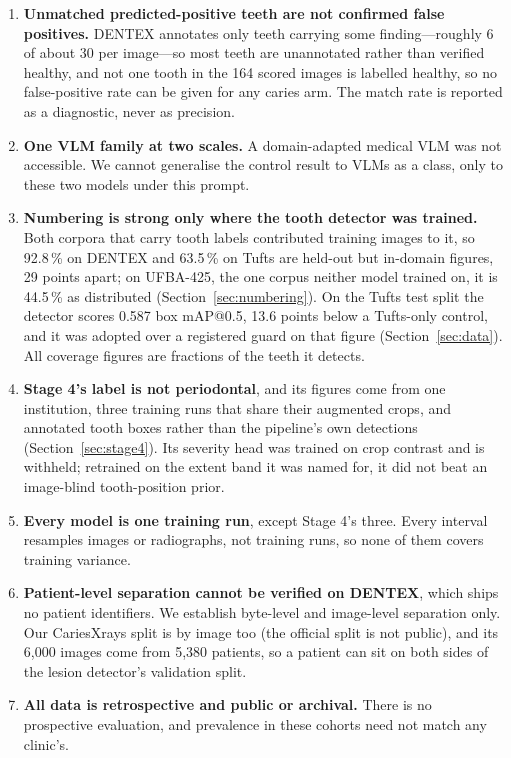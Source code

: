 \documentclass[conference]{IEEEtran}
\begin{document}
\begin{enumerate}
        false-positive rate are not computable there; we report agreement only,
        which cannot be penalised for over-flagging.
  \item \textbf{Unmatched predicted-positive teeth are not confirmed false
        positives.} DENTEX annotates only teeth carrying some finding---roughly 6
        of about 30 per image---so most teeth are unannotated rather than verified
        healthy, and not one tooth in the 164 scored images is labelled healthy,
        so no false-positive rate can be given for any caries arm. The match rate
        is reported as a diagnostic, never as precision.
  \item \textbf{One VLM family at two scales.} A domain-adapted medical VLM was
        not accessible. We cannot generalise the control result to VLMs as a
        class, only to these two models under this prompt.
  \item \textbf{Numbering is strong only where the tooth detector was trained.}
        Both corpora that carry tooth labels contributed training images to it,
        so 92.8\,\% on DENTEX and 63.5\,\% on Tufts are held-out but in-domain
        figures, 29 points apart; on UFBA-425, the one corpus neither model
        trained on, it is 44.5\,\% as distributed (Section~\ref{sec:numbering}). On the Tufts
        test split the detector scores 0.587 box mAP@0.5, 13.6 points below a
        Tufts-only control, and it was adopted over a registered guard on that
        figure (Section~\ref{sec:data}). All coverage figures are fractions of
        the teeth it detects.
  \item \textbf{Stage 4's label is not periodontal}, and its figures come from one
        institution, three training runs that share their augmented crops, and
        annotated tooth boxes rather than the pipeline's own detections
        (Section~\ref{sec:stage4}). Its severity head was trained on crop
        contrast and is withheld; retrained on the extent band it was named
        for, it did not beat an image-blind tooth-position prior.
  \item \textbf{Every model is one training run}, except Stage 4's three. Every
        interval resamples images or radiographs, not training runs, so none of
        them covers training variance.
  \item \textbf{Patient-level separation cannot be verified on DENTEX}, which
        ships no patient identifiers. We establish byte-level and image-level
        separation only. Our CariesXrays split is by image too (the official
        split is not public), and its 6{,}000 images come from 5{,}380 patients,
        so a patient can sit on both sides of the lesion detector's validation
        split.
  \item \textbf{All data is retrospective and public or archival.} There is no
        prospective evaluation, and prevalence in these cohorts need not match any
        clinic's.
\end{enumerate}
\end{document}
